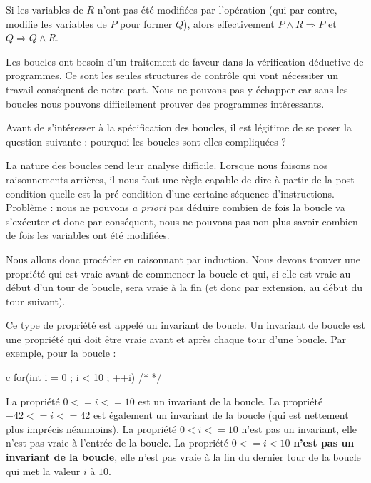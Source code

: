 \documentclass[middle]{zmdocument}
\begin{document}
Si les variables de $R$ n'ont pas été modifiées par l'opération (qui par contre, 
modifie les variables de $P$ pour former $Q$), alors effectivement 
$P \wedge R \Rightarrow P$ et $Q \Rightarrow Q \wedge R$.





Les boucles ont besoin d'un traitement de faveur dans la vérification déductive
de programmes. Ce sont les seules structures de contrôle qui vont nécessiter un
travail conséquent de notre part. Nous ne pouvons pas y échapper car sans les 
boucles nous pouvons difficilement prouver des programmes intéressants.



Avant de s'intéresser à la spécification des boucles, il est légitime de se 
poser la question suivante : pourquoi les boucles sont-elles compliquées ?





La nature des boucles rend leur analyse difficile. Lorsque nous faisons nos 
raisonnements arrières, il nous faut une règle capable de dire à partir de la
post-condition quelle est la pré-condition d'une certaine séquence 
d'instructions. Problème : nous ne pouvons \textit{a priori} pas déduire combien de 
fois la boucle va s'exécuter et donc par conséquent, nous ne pouvons pas non 
plus savoir combien de fois les variables ont été modifiées.



Nous allons donc procéder en raisonnant par induction. Nous devons trouver une
propriété qui est vraie avant de commencer la boucle et qui, si elle est vraie
au début d'un tour de boucle, sera vraie à la fin (et donc par extension, au 
début du tour suivant).



Ce type de propriété est appelé un invariant de boucle. Un invariant de boucle
est une propriété qui doit être vraie avant et après chaque tour d'une boucle. 
Par exemple, pour la boucle :



\begin{CodeBlock}{c}
for(int i = 0 ; i < 10 ; ++i){ /* */ }
\end{CodeBlock}



La propriété $0 <= i <= 10$ est un invariant de la boucle. La propriété 
$-42 <= i <= 42$ est également un invariant de la boucle (qui est nettement
plus imprécis néanmoins). La propriété $0 < i <= 10$ n'est pas un invariant,
elle n'est pas vraie à l'entrée de la boucle. La propriété $0 <= i < 10$ 
\textbf{n'est pas un invariant de la boucle}, elle n'est pas vraie à la fin du 
dernier tour de la boucle qui met la valeur $i$ à $10$.
\end{document}
